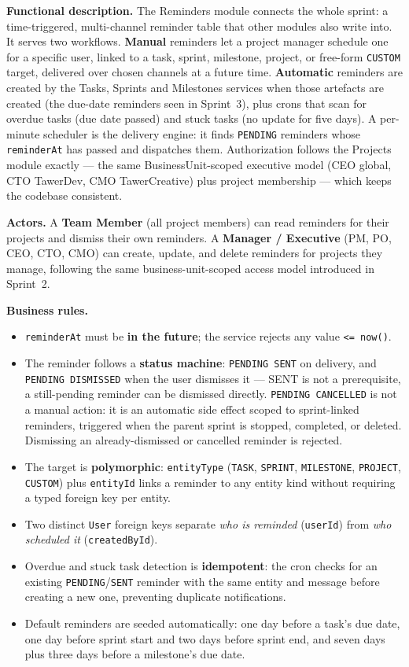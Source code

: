 \textbf{Functional description.} The Reminders module connects the whole sprint: a
time-triggered, multi-channel reminder table that other modules also write into. It serves two
workflows. \textbf{Manual} reminders let a project manager schedule one for a specific user,
linked to a task, sprint, milestone, project, or free-form \texttt{CUSTOM} target, delivered
over chosen channels at a future time. \textbf{Automatic} reminders are created by the Tasks,
Sprints and Milestones services when those artefacts are created (the due-date reminders seen
in Sprint~3), plus crons that scan for overdue tasks (due date passed) and stuck tasks (no
update for five days). A per-minute scheduler is the delivery engine: it finds \texttt{PENDING}
reminders whose \texttt{reminderAt} has passed and dispatches them. Authorization follows the
Projects module exactly --- the same BusinessUnit-scoped executive model (CEO global, CTO
TawerDev, CMO TawerCreative) plus project membership --- which keeps the codebase consistent.

\textbf{Actors.} A \textbf{Team Member} (all project members) can read reminders for their
projects and dismiss their own reminders. A \textbf{Manager / Executive} (PM, PO, CEO, CTO, CMO)
can create, update, and delete reminders for projects they manage, following the same
business-unit-scoped access model introduced in Sprint~2.

\textbf{Business rules.}
\begin{itemize}
  \item \texttt{reminderAt} must be \textbf{in the future}; the service rejects any value
    \texttt{<= now()}.
  \item The reminder follows a \textbf{status machine}: \texttt{PENDING \textrightarrow{} SENT} on
    delivery, and \texttt{PENDING \textrightarrow{} DISMISSED} when the user dismisses it --- SENT
    is not a prerequisite, a still-pending reminder can be dismissed directly.
    \texttt{PENDING \textrightarrow{} CANCELLED} is not a manual action: it is an automatic side
    effect scoped to sprint-linked reminders, triggered when the parent sprint is stopped,
    completed, or deleted. Dismissing an already-dismissed or cancelled reminder is rejected.
  \item The target is \textbf{polymorphic}: \texttt{entityType} (\texttt{TASK}, \texttt{SPRINT},
    \texttt{MILESTONE}, \texttt{PROJECT}, \texttt{CUSTOM}) plus \texttt{entityId} links a reminder
    to any entity kind without requiring a typed foreign key per entity.
  \item Two distinct \texttt{User} foreign keys separate \emph{who is reminded}
    (\texttt{userId}) from \emph{who scheduled it} (\texttt{createdById}).
  \item Overdue and stuck task detection is \textbf{idempotent}: the cron checks for an existing
    \texttt{PENDING}/\texttt{SENT} reminder with the same entity and message before creating a new
    one, preventing duplicate notifications.
  \item Default reminders are seeded automatically: one day before a task's due date, one day
    before sprint start and two days before sprint end, and seven days plus three days before a
    milestone's due date.
\end{itemize}

